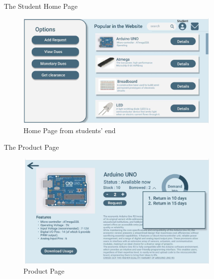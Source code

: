 \documentclass[20pt]{beamer}
\numberwithin{figure}{section}
\begin{document}
\begin{frame}{The Student Home Page}

     \begin{figure}
        \centering
        \includegraphics[width= 0.9\textwidth , height= 0.5\paperheight]{StudentHomeUI.png}
        \caption{Home Page from students' end}
        \label{fig:52}
    \end{figure}

\end{frame}

\begin{frame}{The Product Page}

     \begin{figure}
        \centering
        \includegraphics[width= 0.9\textwidth , height= 0.5\paperheight]{ProductUI.png}
        \caption{Product Page}
        \label{fig:53}
    \end{figure}

\end{frame}
\end{document}
